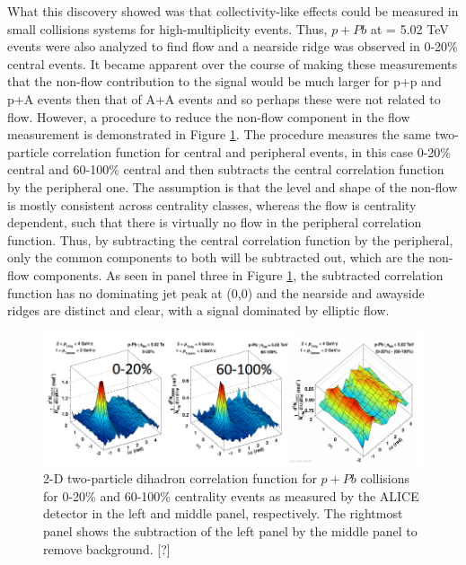 What this discovery showed was that collectivity-like effects could be measured in small collisions systems for high-multiplicity events. Thus, $p+Pb$ at \sqsn = 5.02 TeV events were also analyzed to find flow and a nearside ridge was observed in 0-20\% central events. It became apparent over the course of making these measurements that the non-flow contribution to the signal would be much larger for p+p and p+A events then that of A+A events and so perhaps these were not related to flow. However, a procedure to reduce the non-flow component in the flow measurement is demonstrated in Figure \ref{fig:pPb_ridge_subtraction}. The procedure measures the same two-particle correlation function for central and peripheral events, in this case 0-20\% central and 60-100\% central and then subtracts the central correlation function by the peripheral one. The assumption is that the level and shape of the non-flow is mostly consistent across centrality classes, whereas the flow is centrality dependent, such that there is virtually no flow in the peripheral correlation function. Thus, by subtracting the central correlation function by the peripheral, only the common components to both will be subtracted out, which are the non-flow components. As seen in panel three in Figure \ref{fig:pPb_ridge_subtraction}, the subtracted correlation function has no dominating jet peak at (0,0) and the nearside and awayside ridges are distinct and clear, with a signal dominated by elliptic flow.

\begin{figure}[h!]
\begin{center}
\includegraphics[width=0.85\linewidth]{figs/pPb_subtraction_correlation.PNG}
\caption{ 2-D two-particle dihadron correlation function for $p+Pb$ collisions for 0-20\% and 60-100\% centrality events as measured by the ALICE detector in the left and middle panel, respectively. The rightmost panel shows the subtraction of the left panel by the middle panel to remove background. [?]}
\label{fig:pPb_ridge_subtraction}
\end{center}
\end{figure}

